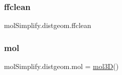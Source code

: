\subsubsection{\texorpdfstring{ffclean}{ffclean}}
{\footnotesize\ttfamily mol\+Simplify.\+distgeom.\+ffclean}

\mbox{\label{namespacemolSimplify_1_1distgeom_a1ec709e458f1fd6d747723c8b11e8c01}} 
\subsubsection{\texorpdfstring{mol}{mol}}
{\footnotesize\ttfamily mol\+Simplify.\+distgeom.\+mol = \hyperlink{classmolSimplify_1_1Classes_1_1mol3D_1_1mol3D}{mol3D}()}

